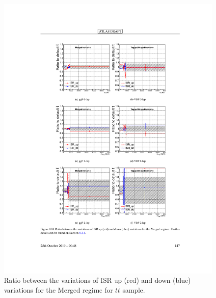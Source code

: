 \begin{figure}[h!]
  \centering
  \includegraphics[width=\hsize]{figures/Analysis/modelingsysts/ttbar_isr_merg.pdf}
            \caption{Ratio between the variations of ISR up (red) and down (blue) variations for the Merged regime for $t\bar{t}$ sample.} 
  \label{fig:ttbar_isr_merg}
\end{figure} 
\FloatBarrier


